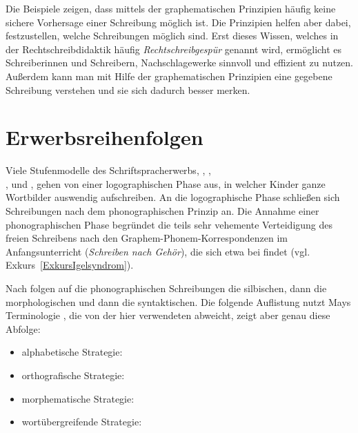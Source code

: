 Die Beispiele zeigen, dass mittels der graphematischen Prinzipien häufig keine sichere Vorhersage einer Schreibung möglich ist. Die Prinzipien helfen aber dabei, festzustellen, welche Schreibungen möglich sind. Erst dieses Wissen, welches in der Rechtschreibdidaktik häufig \textit{Rechtschreibgespür} genannt wird, ermöglicht es Schreiberinnen und Schreibern, Nachschlagewerke sinnvoll und effizient zu nutzen. Außerdem kann man mit Hilfe der graphematischen Prinzipien eine gegebene Schreibung verstehen und sie sich dadurch besser merken.

\section{Erwerbsreihenfolgen}
\label{sec:Erwerbsreihenfolgen}
Viele Stufenmodelle des Schriftspracherwerbs, \zB \citet{Frith1985}, \citet{Valtin1997}, \\ \citet{Scheerer-Neumann1998}, \citet{Thome2006} und \citet{May2013}, gehen von einer logographischen Phase aus, in welcher Kinder ganze Wortbilder auswendig aufschreiben. An die logographische Phase schließen sich Schreibungen nach dem phonographischen Prinzip an. Die Annahme einer phonographischen Phase begründet die teils sehr vehemente Verteidigung des freien Schreibens nach den Graphem-Phonem-Korrespondenzen im Anfangsunterricht (\textit{Schreiben nach Gehör}), die sich etwa bei \citet{Brinkmann2018} findet (vgl. Exkurs~\ref{ExkursIgelsyndrom}). 

Nach \citet{May2013} folgen auf die phonographischen Schreibungen die silbischen, dann die morphologischen und dann die syntaktischen. Die folgende Auflistung nutzt Mays Terminologie \citep[127]{May2013}, die von der hier verwendeten abweicht, zeigt aber genau diese Abfolge:

\begin{itemize}
    \item alphabetische Strategie: 
    \item orthografische Strategie: 
    \item morphematische Strategie: 
    \item wortübergreifende Strategie: 
\end{itemize}

